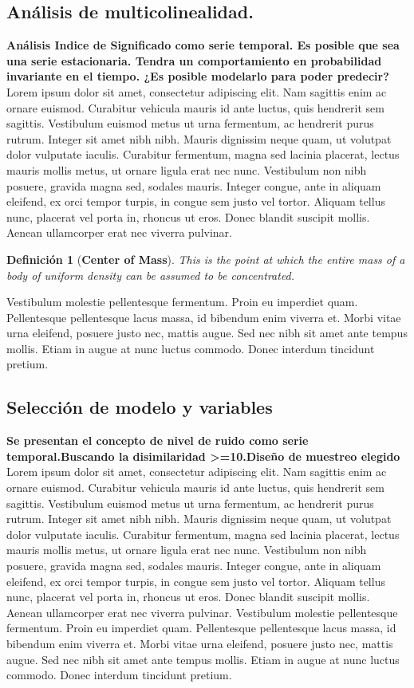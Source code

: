 \documentclass[a4paper,12pt,twocolumn]{article}
\newtheorem{dfn}{Definición}
\begin{document}
\subsection{Análisis de multicolinealidad.}
\textbf{Análisis Indice de Significado como serie temporal. Es posible que sea una serie estacionaria. Tendra un comportamiento en probabilidad invariante en el tiempo. ¿Es posible modelarlo para poder predecir?}
Lorem ipsum dolor sit amet, consectetur adipiscing elit. Nam sagittis enim ac ornare euismod. Curabitur vehicula mauris id ante luctus, quis hendrerit sem sagittis. Vestibulum euismod metus ut urna fermentum, ac hendrerit purus rutrum. Integer sit amet nibh nibh. Mauris dignissim neque quam, ut volutpat dolor vulputate iaculis. Curabitur fermentum, magna sed lacinia placerat, lectus mauris mollis metus, ut ornare ligula erat nec nunc. Vestibulum non nibh posuere, gravida magna sed, sodales mauris. Integer congue, ante in aliquam eleifend, ex orci tempor turpis, in congue sem justo vel tortor. Aliquam tellus nunc, placerat vel porta in, rhoncus ut eros. Donec blandit suscipit mollis. Aenean ullamcorper erat nec viverra pulvinar. 
\begin{dfn}[\bf Center of Mass]\label{dfn-cm}
This is the point at which the entire mass of
a body of uniform density can be assumed to
be concentrated.
\end{dfn} 
Vestibulum molestie pellentesque fermentum. Proin eu imperdiet quam. Pellentesque pellentesque lacus massa, id bibendum enim viverra et. Morbi vitae urna eleifend, posuere justo nec, mattis augue. Sed nec nibh sit amet ante tempus mollis. Etiam in augue at nunc luctus commodo. Donec interdum tincidunt pretium. 
\subsection{Selección de modelo y variables}
\textbf{Se presentan el concepto de nivel de ruido como serie temporal.Buscando la disimilaridad  >=10.Diseño de muestreo elegido}
Lorem ipsum dolor sit amet, consectetur adipiscing elit. Nam sagittis enim ac ornare euismod. Curabitur vehicula mauris id ante luctus, quis hendrerit sem sagittis. Vestibulum euismod metus ut urna fermentum, ac hendrerit purus rutrum. Integer sit amet nibh nibh. Mauris dignissim neque quam, ut volutpat dolor vulputate iaculis. Curabitur fermentum, magna sed lacinia placerat, lectus mauris mollis metus, ut ornare ligula erat nec nunc. Vestibulum non nibh posuere, gravida magna sed, sodales mauris. Integer congue, ante in aliquam eleifend, ex orci tempor turpis, in congue sem justo vel tortor. Aliquam tellus nunc, placerat vel porta in, rhoncus ut eros. Donec blandit suscipit mollis. Aenean ullamcorper erat nec viverra pulvinar. 
Vestibulum molestie pellentesque fermentum. Proin eu imperdiet quam. Pellentesque pellentesque lacus massa, id bibendum enim viverra et. Morbi vitae urna eleifend, posuere justo nec, mattis augue. Sed nec nibh sit amet ante tempus mollis. Etiam in augue at nunc luctus commodo. Donec interdum tincidunt pretium. 
\end{document}
